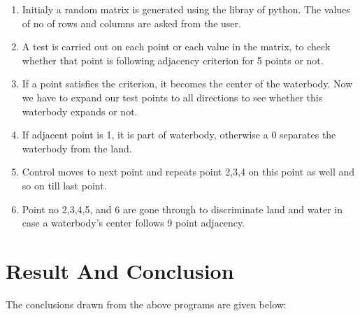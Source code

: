 \documentclass [12 pt ]{article}
\begin{document}
\begin{enumerate}
\item Initialy a random matrix is generated using the libray of python. The values of no of rows and columns are asked from the user.
\item A test is carried out on each point or each value in the matrix, to check whether that point is following adjacency criterion for 5 points or not.
\item If a point satisfies the criterion, it becomes the center of the waterbody. Now we have to expand our test points to all directions to see
whether this waterbody expands or not. 
\item If adjacent point is 1, it is part of waterbody, otherwise a 0 separates the waterbody from the land.
\item Control moves to next point and repeats point 2,3,4 on this point as well and so on till last point.
\item Point no 2,3,4,5, and 6 are gone through to discriminate land and water in case a waterbody's center follows 9 point adjacency.

  \end{enumerate}
 
 \newpage



 
  \section{Result And Conclusion}
The conclusions drawn from the above programs are given below:
\end{document}
